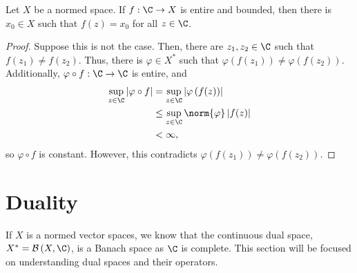 \documentclass[10pt]{mypackage}
\begin{document}
  \begin{corollary}
    Let $X$ be a normed space. If $f: \C\rightarrow X$ is entire and bounded, then there is $x_0\in X$ such that $f(z) = x_0$ for all $z\in \C$.
  \end{corollary}
  \begin{proof}
    Suppose this is not the case. Then, there are $z_1,z_2\in \C$ such that $f\left(z_1\right)\neq f\left(z_2\right)$. Thus, there is $\varphi\in X^{\ast}$ such that $\varphi\left(f\left(z_1\right)\right) \neq \varphi\left(f\left(z_2\right)\right)$. Additionally, $\varphi\circ f: \C\rightarrow \C$ is entire, and
    \begin{align*}
      \sup_{z\in\C}\left\vert \varphi\circ f \right\vert &= \sup_{z\in\C}\left\vert \varphi\left(f(z)\right) \right\vert\\
                                                         &\leq \sup_{z\in \C}\norm{\varphi}\left\vert f(z) \right\vert\\
                                                         &< \infty,
    \end{align*}
    so $\varphi\circ f$ is constant. However, this contradicts $\varphi\left(f\left(z_1\right)\right)\neq \varphi\left(f\left(z_2\right)\right)$.
  \end{proof}
\section{Duality}%
If $X$ is a normed vector spaces, we know that the continuous dual space, $X^{\ast} = \mathcal{B}\left(X,\C\right)$, is a Banach space as $\C$ is complete. This section will be focused on understanding dual spaces and their operators.
\end{document}
